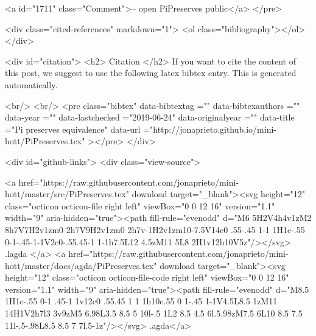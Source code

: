 <a id="1711" class="Comment">-- open PiPreserves public</a>
</pre>


  <div class="cited-references" markdown="1">
  <ol class="bibliography"></ol>
  </div>


  
  <div id="citation">
  <h2> Citation </h2>
  If you want to cite the content of this post,
  we suggest to use the following latex bibtex entry.
  This is generated automatically.

  <br/>
  <br/>
  <pre class="bibtex"
       data-bibtextag =""
       data-bibtexauthors =""
       data-year =""
       data-lastchecked ="2019-06-24"
       data-originalyear =""
       data-title ="Pi preserves equivalence"
       data-url ="http://jonaprieto.github.io/mini-hott/PiPreserves.tex"
  ></pre>
  </div>
  

  <div id="github-links">
    <div class="view-source">
      
        <a href="https://raw.githubusercontent.com/jonaprieto/mini-hott/master/src/PiPreserves.tex" download target="_blank"><svg height="12" class="octicon octicon-file right left" viewBox="0 0 12 16" version="1.1" width="9" aria-hidden="true"><path fill-rule="evenodd" d="M6 5H2V4h4v1zM2 8h7V7H2v1zm0 2h7V9H2v1zm0 2h7v-1H2v1zm10-7.5V14c0 .55-.45 1-1 1H1c-.55 0-1-.45-1-1V2c0-.55.45-1 1-1h7.5L12 4.5zM11 5L8 2H1v12h10V5z"/></svg> .lagda </a>
        <a href="https://raw.githubusercontent.com/jonaprieto/mini-hott/master/docs/agda/PiPreserves.tex" download target="_blank"><svg height="12" class="octicon octicon-file-code right left" viewBox="0 0 12 16" version="1.1" width="9" aria-hidden="true"><path fill-rule="evenodd" d="M8.5 1H1c-.55 0-1 .45-1 1v12c0 .55.45 1 1 1h10c.55 0 1-.45 1-1V4.5L8.5 1zM11 14H1V2h7l3 3v9zM5 6.98L3.5 8.5 5 10l-.5 1L2 8.5 4.5 6l.5.98zM7.5 6L10 8.5 7.5 11l-.5-.98L8.5 8.5 7 7l.5-1z"/></svg> .agda</a>
      

